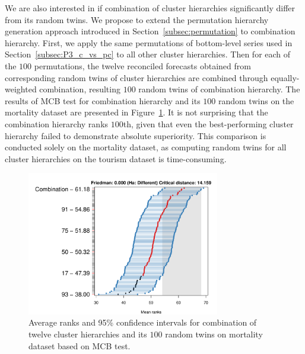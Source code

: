 \documentclass[a4paper,review,12pt,authoryear]{elsarticle}
\begin{document}
We are also interested in if combination of cluster hierarchies significantly differ from its random twins. We propose to extend the permutation hierarchy generation approach introduced in Section~\ref{subsec:permutation} to combination hierarchy. 
First, we apply the same permutations of bottom-level series used in Section~\ref{subsec:P3_c_vs_pc} to all other cluster hierarchies.
Then for each of the $100$ permutations, the twelve reconciled forecasts obtained from corresponding random twins of cluster hierarchies are combined through equally-weighted combination, resulting $100$ random twins of combination hierarchy.
The results of MCB test for combination hierarchy and its $100$ random twins on the mortality dataset are presented in Figure~\ref{fig:P4_a_vs_pa}.
It is not surprising that the combination hierarchy ranks $100$th, given that even the best-performing cluster hierarchy failed to demonstrate absolute superiority.
This comparison is conducted solely on the mortality dataset, as computing random twins for all cluster hierarchies on the tourism dataset is time-consuming.
\begin{figure}[h!]
\vspace{-0.1in}
    \centering
    \includegraphics[width=0.75\textwidth]{figures/hierarchy_rmsse/mortality/P4_average_vs_pa_h12.pdf}
    \caption{\label{fig:P4_a_vs_pa} Average ranks and 95\% confidence intervals for combination of twelve cluster hierarchies and its $100$ random twins on mortality dataset based on MCB test.}
\end{figure}

\clearpage 
\newpage 

\end{document}
